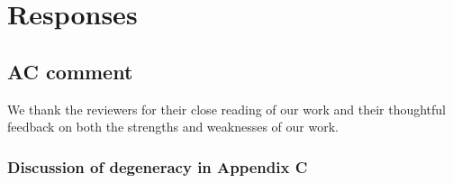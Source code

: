 \documentclass[11pt]{article}
\title{}
\date{}
\author{}
\begin{document}
\maketitle
\vspace{-3.5em}

\section{Responses}

\subsection{AC comment}


We thank the reviewers for their close reading of our work and their thoughtful feedback on both the strengths and weaknesses of our work.

\subsubsection{Discussion of degeneracy in Appendix C}
\end{document}
